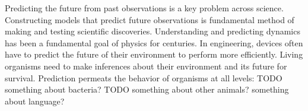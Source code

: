 \documentclass[11pt,letterpaper]{article}
\begin{document}


%
%
%
%
%
%
%
%
%



Predicting the future from past observations is a key problem across science.
Constructing models that predict future observations is fundamental method of making and testing scientific discoveries.
Understanding and predicting dynamics has been a fundamental goal of physics for centuries.
In engineering, devices often have to predict the future of their environment to perform more efficiently.
Living organisms need to make inferences about their environment and its future for survival.
Prediction permeats the behavior of organisms at all levels:
TODO something about bacteria?
TODO something about other animals?
something about language?
\end{document}
